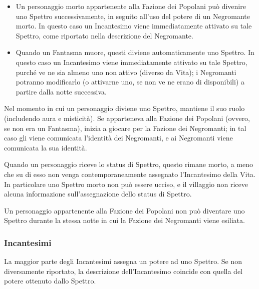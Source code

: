 \documentclass[a4paper,10pt]{article}
\begin{document}
\begin{itemize}
\begin{itemize}
		\item Un personaggio morto appartenente alla Fazione dei Popolani può divenire uno Spettro successivamente, in seguito all'uso del potere di un Negromante morto. In questo caso un Incantesimo viene immediatamente attivato su tale Spettro, come riportato nella descrizione del Negromante.
		
		\item Quando un Fantasma muore, questi diviene automaticamente uno Spettro. In questo caso un Incantesimo viene immediatamente attivato su tale Spettro, purché ve ne sia almeno uno non attivo (diverso da Vita); i Negromanti potranno modificarlo (o attivarne uno, se non ve ne erano di disponibili) a partire dalla notte successiva.
	\end{itemize}
 	
 	Nel momento in cui un personaggio diviene uno Spettro, mantiene il suo ruolo (includendo aura e misticità). Se apparteneva alla Fazione dei Popolani (ovvero, se non era un Fantasma), inizia a giocare per la Fazione dei Negromanti; in tal caso gli viene comunicata l'identità dei Negromanti, e ai Negromanti viene comunicata la sua identità.
 	
	Quando un personaggio riceve lo status di Spettro, questo rimane morto, a meno che su di esso non venga contemporaneamente assegnato l'Incantesimo della Vita.
	In particolare uno Spettro morto non può essere ucciso, e il villaggio non riceve alcuna informazione sull'assegnazione dello status di Spettro.
	
	Un personaggio appartenente alla Fazione dei Popolani non può diventare uno Spettro durante la stessa notte in cui la Fazione dei Negromanti viene esiliata.
	
\end{itemize}


\subsubsection*{Incantesimi}

La maggior parte degli Incantesimi assegna un potere ad uno Spettro. Se non diversamente riportato, la descrizione dell'Incantesimo coincide con quella del potere ottenuto dallo Spettro.
\end{document}
